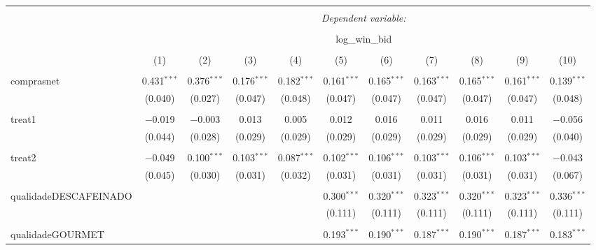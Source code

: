 
\begin{table}[!htbp] \centering 
  \caption{} 
  \label{} 
\begin{tabular}{@{\extracolsep{5pt}}lcccccccccc} 
\\[-1.8ex]\hline 
\hline \\[-1.8ex] 
 & \multicolumn{10}{c}{\textit{Dependent variable:}} \\ 
\cline{2-11} 
\\[-1.8ex] & \multicolumn{10}{c}{log\_win\_bid} \\ 
\\[-1.8ex] & (1) & (2) & (3) & (4) & (5) & (6) & (7) & (8) & (9) & (10)\\ 
\hline \\[-1.8ex] 
 comprasnet & 0.431$^{***}$ & 0.376$^{***}$ & 0.176$^{***}$ & 0.182$^{***}$ & 0.161$^{***}$ & 0.165$^{***}$ & 0.163$^{***}$ & 0.165$^{***}$ & 0.161$^{***}$ & 0.139$^{***}$ \\ 
  & (0.040) & (0.027) & (0.047) & (0.048) & (0.047) & (0.047) & (0.047) & (0.047) & (0.047) & (0.048) \\ 
  & & & & & & & & & & \\ 
 treat1 & $-$0.019 & $-$0.003 & 0.013 & 0.005 & 0.012 & 0.016 & 0.011 & 0.016 & 0.011 & $-$0.056 \\ 
  & (0.044) & (0.028) & (0.029) & (0.029) & (0.029) & (0.029) & (0.029) & (0.029) & (0.029) & (0.040) \\ 
  & & & & & & & & & & \\ 
 treat2 & $-$0.049 & 0.100$^{***}$ & 0.103$^{***}$ & 0.087$^{***}$ & 0.102$^{***}$ & 0.106$^{***}$ & 0.103$^{***}$ & 0.106$^{***}$ & 0.103$^{***}$ & $-$0.043 \\ 
  & (0.045) & (0.030) & (0.031) & (0.032) & (0.031) & (0.031) & (0.031) & (0.031) & (0.031) & (0.067) \\ 
  & & & & & & & & & & \\ 
 qualidadeDESCAFEINADO &  &  &  &  & 0.300$^{***}$ & 0.320$^{***}$ & 0.323$^{***}$ & 0.320$^{***}$ & 0.323$^{***}$ & 0.336$^{***}$ \\ 
  &  &  &  &  & (0.111) & (0.111) & (0.111) & (0.111) & (0.111) & (0.111) \\ 
  & & & & & & & & & & \\ 
 qualidadeGOURMET &  &  &  &  & 0.193$^{***}$ & 0.190$^{***}$ & 0.187$^{***}$ & 0.190$^{***}$ & 0.187$^{***}$ & 0.183$^{***}$ \\ 

\end{tabular}
\end{table}
